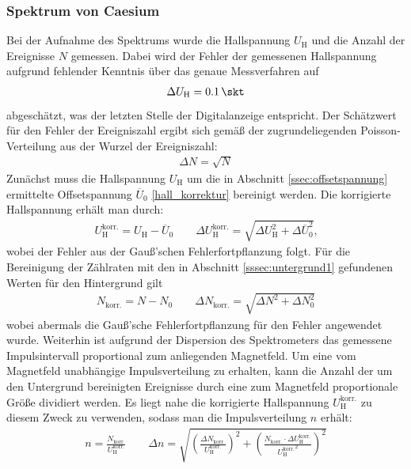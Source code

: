 \documentclass[11pt, a4paper]{article}
\numberwithin{equation}{section}
\begin{document}
\subsubsection{Spektrum von Caesium}
\label{sssec:spektrum_caesium}
Bei der Aufnahme des Spektrums wurde die Hallspannung $U_\mathrm{H}$ und die Anzahl der Ereignisse $N$ gemessen.
Dabei wird der Fehler der gemessenen Hallspannung aufgrund fehlender Kenntnis über das genaue Messverfahren auf
\begin{align}
	\Delta U_\mathrm{H} = \SI{0.1}{\skt}
\end{align}
abgeschätzt, was der letzten Stelle der Digitalanzeige entspricht.
Der Schätzwert für den Fehler der Ereigniszahl ergibt sich gemäß der zugrundeliegenden Poisson-Verteilung aus der Wurzel der Ereigniszahl:
\begin{align}
	\Delta N = \sqrt{N}
\end{align}
Zunächst muss die Hallspannung $U_\mathrm{H}$ um die in Abschnitt \ref{ssec:offsetspannung} ermittelte Offsetspannung $\overline{U}_0$ \eqref{hall_korrektur} bereinigt werden.
Die korrigierte Hallspannung erhält man durch:
\begin{align}
U_\mathrm{H}^\mathrm{korr.} = U_\mathrm{H} - \overline{U}_0 \qquad
\Delta U_\mathrm{H}^\mathrm{korr.} = \sqrt{\Delta U_\mathrm{H}^2 + \Delta \overline{U}_0^2} \text{,}
\end{align}
wobei der Fehler aus der Gauß'schen Fehlerfortpflanzung folgt.
Für die Bereinigung der Zählraten mit den in Abschnitt \ref{sssec:untergrund1} gefundenen Werten für den Hintergrund gilt
\begin{align}
	N_\mathrm{korr.} = N - N_0 \qquad \Delta N_\mathrm{korr.} = \sqrt{\Delta N^2 + \Delta N_0^2}
\end{align}
wobei abermals die Gauß'sche Fehlerfortpflanzung für den Fehler angewendet wurde.
Weiterhin ist aufgrund der Dispersion des Spektrometers das gemessene Impulsintervall proportional zum anliegenden Magnetfeld.
Um eine vom Magnetfeld unabhängige Impulsverteilung zu erhalten, kann die Anzahl der um den Untergrund bereinigten Ereignisse durch eine zum Magnetfeld proportionale Größe dividiert werden.
Es liegt nahe die korrigierte Hallspannung $U_\mathrm{H}^\mathrm{korr.}$ zu diesem Zweck zu verwenden, sodass man die Impulsverteilung $n$ erhält:
\begin{align}
	n = \frac{N_\mathrm{korr.}}{U_\mathrm{H}^\mathrm{korr.}} \qquad \Delta n = \sqrt{\left( \frac{\Delta N_\mathrm{korr.}}{U_\mathrm{H}^\mathrm{korr.}}\right)^2 + \left( \frac{N_\mathrm{korr.} \cdot \Delta U_\mathrm{H}^\mathrm{korr.}}{ {U_\mathrm{H}^\mathrm{korr.}}^2 }\right)^2}
\end{align}
\end{document}

